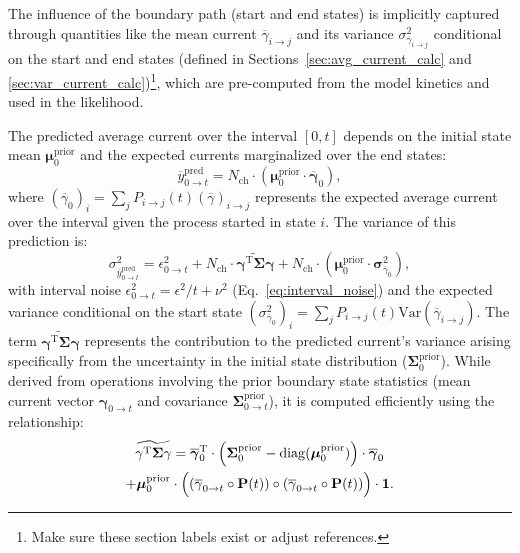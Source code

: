 \documentclass[pdflatex,sn-nature]{sn-jnl}%
\begin{document}
The influence of the boundary path (start and end states) is implicitly captured through quantities like the mean current \(\overline{\gamma}_{i \rightarrow j}\) and its variance \(\sigma^2_{\overline{\gamma}_{i \rightarrow j}}\) conditional on the start and end states (defined in Sections~\ref{sec:avg_current_calc} and \ref{sec:var_current_calc})\footnote{Make sure these section labels exist or adjust references.}, which are pre-computed from the model kinetics and used in the likelihood.

The predicted average current over the interval \([0, t]\) depends on the initial state mean \(\boldsymbol{\mu}^{\text{prior}}_0\) and the expected currents marginalized over the end states:
\begin{equation}
	\overline{y}^{\text{pred}}_{0 \rightarrow t} = N_{\text{ch}} \cdot (\boldsymbol{\mu}^{\text{prior}}_{0} \cdot \overline{\boldsymbol{\gamma}}_{0}),
	\label{eq:macro_interval_predicted_y}
\end{equation}
where \( (\overline{\gamma}_{0})_i = \sum_j P_{i\rightarrow j}(t) (\overline{\gamma})_{i \rightarrow j} \) represents the expected average current over the interval given the process started in state \(i\). The variance of this prediction is:
\begin{equation}
	\sigma^2_{\overline{y}^{\text{pred}}_{0 \rightarrow t}} = \epsilon^2_{0 \rightarrow t} + N_{\text{ch}} \cdot \widetilde{\mathbf{\gamma}^{\mathrm{T}} \mathbf{\Sigma}\mathbf{\gamma}} + N_{\text{ch}} \cdot (\boldsymbol{\mu}^{\text{prior}}_{0} \cdot \boldsymbol{\sigma}^2_{\overline{\gamma}_{0}}),
	\label{eq:macro_interval_sigma_pred}
\end{equation}
with interval noise \( \epsilon^2_{0 \rightarrow t} = \epsilon^2/t + \nu^2 \) (Eq.~\ref{eq:interval_noise}) and the expected variance conditional on the start state \( (\sigma^2_{\overline{\gamma}_{0}})_i = \sum_j P_{i\rightarrow j}(t) \mathrm{Var}(\overline{\gamma}_{i\rightarrow j}) \). The term \( \widetilde{\mathbf{\gamma}^{\mathrm{T}} \mathbf{\Sigma}\mathbf{\gamma}} \) represents the contribution to the predicted current's variance arising specifically from the uncertainty in the initial state distribution (\( \boldsymbol{\Sigma}^{\text{prior}}_{0} \)). While derived from operations involving the prior boundary state statistics (mean current vector \(\boldsymbol{\gamma}_{0 \rightarrow t}\) and covariance \(\boldsymbol{\Sigma}^{\text{prior}}_{0 \rightarrow t}\)), it is computed efficiently using the relationship:
\begin{multline}
	\widetilde{\mathbf{\gamma}^{\mathrm{T}} \mathbf{\Sigma}\mathbf{\gamma}} = \overline{\boldsymbol{\gamma}}_{0}^{\mathrm{T}} \cdot \Bigl( \boldsymbol{\Sigma}^{\text{prior}}_{0} - \mathrm{diag}(\boldsymbol{\mu}^{\text{prior}}_0) \Bigr) \cdot \overline{\boldsymbol{\gamma}}_{0} \\ %
	+ \boldsymbol{\mu}^{\text{prior}}_0 \cdot \Bigl( (\overline{\mathbf{\gamma}}_{0 \rightarrow t} \circ \mathbf{P}(t)) \circ (\overline{\mathbf{\gamma}}_{0 \rightarrow t} \circ \mathbf{P}(t)) \Bigr) \cdot \mathbf{1}. 
	\label{eq:simplified_boundary_state} %
\end{multline}
\end{document}
